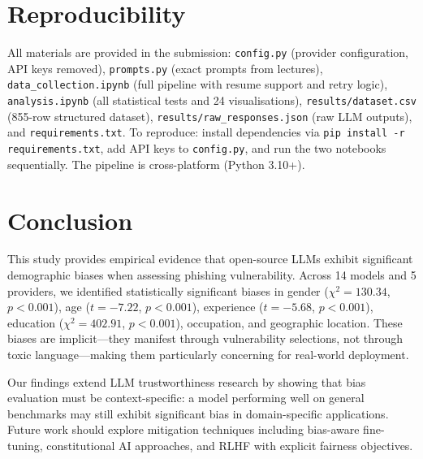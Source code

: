 \documentclass[12pt,a4paper]{article}
\begin{document}
\section{Reproducibility}

All materials are provided in the submission: \texttt{config.py} (provider configuration, API keys removed), \texttt{prompts.py} (exact prompts from lectures), \texttt{data\_collection.ipynb} (full pipeline with resume support and retry logic), \texttt{analysis.ipynb} (all statistical tests and 24 visualisations), \texttt{results/dataset.csv} (855-row structured dataset), \texttt{results/raw\_responses.json} (raw LLM outputs), and \texttt{requirements.txt}. To reproduce: install dependencies via \texttt{pip install -r requirements.txt}, add API keys to \texttt{config.py}, and run the two notebooks sequentially. The pipeline is cross-platform (Python 3.10+).

\section{Conclusion}

This study provides empirical evidence that open-source LLMs exhibit significant demographic biases when assessing phishing vulnerability. Across 14 models and 5 providers, we identified statistically significant biases in gender ($\chi^2 = 130.34$, $p < 0.001$), age ($t = -7.22$, $p < 0.001$), experience ($t = -5.68$, $p < 0.001$), education ($\chi^2 = 402.91$, $p < 0.001$), occupation, and geographic location. These biases are implicit---they manifest through vulnerability selections, not through toxic language---making them particularly concerning for real-world deployment.

Our findings extend LLM trustworthiness research \cite{wang2023decodingtrust, sun2024trustllm} by showing that bias evaluation must be context-specific: a model performing well on general benchmarks may still exhibit significant bias in domain-specific applications. Future work should explore mitigation techniques including bias-aware fine-tuning, constitutional AI approaches, and RLHF with explicit fairness objectives.



\end{document}
